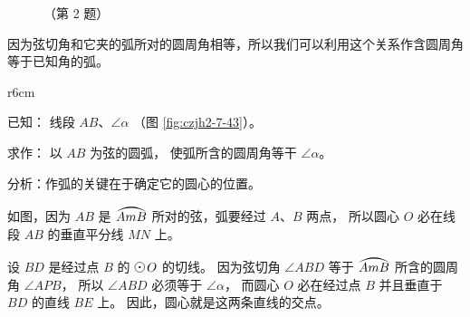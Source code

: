 \begin{lianxi}


\begin{figure}[htbp]
    \centering
    \begin{minipage}[b]{7cm}
        \centering
        
        \caption*{（第 1 题）}
    \end{minipage}
    \qquad
    \begin{minipage}[b]{7cm}
        \centering
        
        \caption*{（第 2 题）}
    \end{minipage}
\end{figure}

\begin{xiaoxiaotis}


\end{xiaoxiaotis}

\end{lianxi}


因为弦切角和它夹的弧所对的圆周角相等，所以我们可以利用这个关系作含圆周角等于已知角的弧。


\begin{wrapfigure}[9]{r}{6cm}
    \centering
    
    \caption{}\label{fig:czjh2-7-43}
\end{wrapfigure}

\liti {}

已知： 线段 $AB$、$\angle \alpha$ （图 \ref{fig:czjh2-7-43}）。

求作： 以 $AB$ 为弦的圆弧， 使弧所含的圆周角等干 $\angle \alpha$。

分析：作弧的关键在于确定它的圆心的位置。

如图，因为 $AB$ 是 $\yuanhu{AmB}$ 所对的弦，弧要经过 $A$、$B$ 两点，
所以圆心 $O$ 必在线段 $AB$ 的垂直平分线 $MN$ 上。

设 $BD$ 是经过点 $B$ 的 $\yuan\,O$ 的切线。
因为弦切角 $\angle ABD$ 等于 $\yuanhu{AmB}$ 所含的圆周角 $\angle APB$，
所以 $\angle ABD$ 必须等于 $\angle \alpha$，
而圆心 $O$ 必在经过点 $B$ 并且垂直于 $BD$ 的直线 $BE$ 上。
因此，圆心就是这两条直线的交点。

